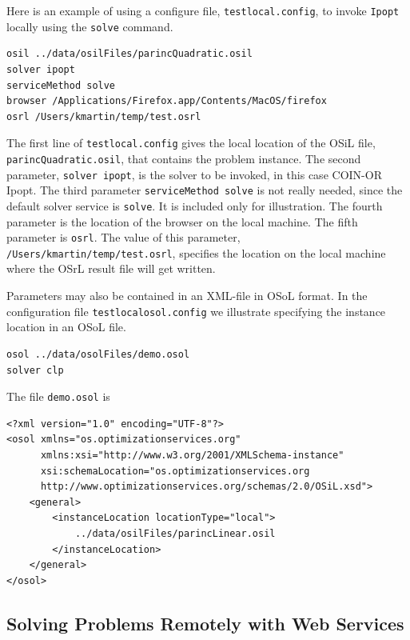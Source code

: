 Here is an example of using a configure file,  {\tt testlocal.config},
to invoke {\tt Ipopt} locally using the {\tt solve} command.

\begin{verbatim}
osil ../data/osilFiles/parincQuadratic.osil
solver ipopt
serviceMethod solve
browser /Applications/Firefox.app/Contents/MacOS/firefox
osrl /Users/kmartin/temp/test.osrl
\end{verbatim}



The first line of {\tt testlocal.config} gives the local location
of the OSiL file,
{\tt parincQuadratic.osil}, that contains the problem instance. The second parameter,
{\tt solver ipopt},  is the solver to be invoked, in this case COIN-OR Ipopt.
The third parameter {\tt serviceMethod solve} is not really needed, since the default solver service 
is {\tt solve}. It is included only for illustration. 
The fourth parameter is the location of the browser on the local machine. 
The fifth parameter is  {\tt osrl}. The value of this parameter, {\tt /Users/kmartin/temp/test.osrl}, 
specifies the location on the local machine where the OSrL result file will get written.


Parameters may also be contained in an XML-file in OSoL format. In the configuration file
{\tt testlocalosol.config} we illustrate specifying the instance location in an OSoL file.
\begin{verbatim}
osol ../data/osolFiles/demo.osol
solver clp
\end{verbatim}
The file {\tt demo.osol} is

\begin{verbatim}
<?xml version="1.0" encoding="UTF-8"?>
<osol xmlns="os.optimizationservices.org"
      xmlns:xsi="http://www.w3.org/2001/XMLSchema-instance"
      xsi:schemaLocation="os.optimizationservices.org
      http://www.optimizationservices.org/schemas/2.0/OSiL.xsd">
    <general>
        <instanceLocation locationType="local">
            ../data/osilFiles/parincLinear.osil
        </instanceLocation>
    </general>
</osol>
\end{verbatim}


\subsection{Solving Problems Remotely with Web Services}\label{section:servicemethods}

